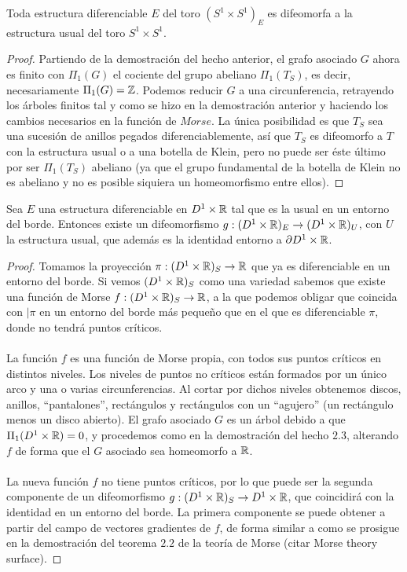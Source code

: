 \begin{hecho}
	Toda estructura diferenciable $E$ del toro $(S^1 \times S^1)_E$ es difeomorfa a la estructura usual del toro $S^1 \times S^1$.
\end{hecho}

\begin{proof}
	Partiendo de la demostración del hecho anterior, el grafo asociado $G$ ahora es finito con $\Pi_1(G)$ el cociente del grupo abeliano $\Pi_1(T_S)$, es decir, necesariamente $\Pi_1(G) = \mathbb{Z}$. Podemos reducir $G$ a una circunferencia, retrayendo los árboles finitos tal y como se hizo en la demostración anterior y haciendo los cambios necesarios en la función de $Morse$. La única posibilidad es que $T_S$ sea una sucesión de anillos pegados diferenciablemente, así que $T_S$ es difeomorfo a $T$ con la estructura usual o a una botella de Klein, pero no puede ser éste último por ser $\Pi_1(T_S)$ abeliano (ya que el grupo fundamental de la botella de Klein no es abeliano y no es posible siquiera un homeomorfismo entre ellos).
\end{proof}

\begin{hecho}
	Sea $E$ una estructura diferenciable en $D^1 \times \mathbb{R}$ tal que es la usual en un entorno del borde. Entonces existe un difeomorfismo $g:(D^1 \times \mathbb{R})_E \rightarrow (D^1 \times \mathbb{R})_U$, con $U$ la estructura usual, que además es la identidad entorno a $\partial D^1 \times \mathbb{R}$.
\end{hecho}

\begin{proof}
	Tomamos la proyección $\pi : (D^1 \times \mathbb{R})_S \rightarrow \mathbb{R}$ que ya es diferenciable en un entorno del borde. Si vemos $(D^1 \times \mathbb{R})_{S}$ como una variedad sabemos que existe una  función de Morse $f : (D^1 \times \mathbb{R})_S \rightarrow \mathbb{R}$, a la que podemos obligar que coincida con $|\pi$ en un entorno del borde más pequeño que en el que es diferenciable $\pi$, donde no tendrá puntos críticos. \\
	\\ La función $f$ es una función de Morse propia, con todos sus puntos críticos en distintos niveles. Los niveles de puntos no críticos están formados por un único arco y una o varias circunferencias. Al cortar por dichos niveles obtenemos discos, anillos, ``pantalones'', rectángulos y rectángulos con un ``agujero'' (un rectángulo menos un disco abierto). El grafo asociado $G$ es un árbol debido a que $\Pi_1(D^1 \times \mathbb{R}) = 0$, y procedemos como en la demostración del hecho $2.3$, alterando $f$ de forma que el $G$ asociado sea homeomorfo a $\mathbb{R}$. \\
	\\ La nueva función $f$ no tiene puntos críticos, por lo que puede ser la segunda componente de un difeomorfismo $g:(D^1 \times \mathbb{R})_S \rightarrow D^1 \times \mathbb{R}$, que coincidirá con la identidad en un entorno del borde. La primera componente se puede obtener a partir del campo de vectores gradientes de $f$, de forma similar a como se prosigue en la demostración del teorema $2.2$ de la teoría de Morse (citar Morse theory surface).
\end{proof}

